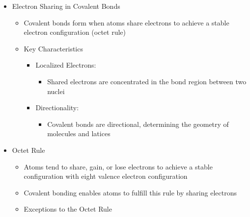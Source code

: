 \begin{itemize}

  \item Electron Sharing in Covalent Bonds

    \begin{itemize}

      \item Covalent bonds form when atoms share electrons to achieve a stable electron configuration (octet rule)

      \item Key Characteristics

        \begin{itemize}

          \item Localized Electrons:

            \begin{itemize}

              \item Shared electrons are concentrated in the bond region between two nuclei

            \end{itemize}

          \item Directionality:

            \begin{itemize}

              \item Covalent bonds are directional, determining the geometry of molecules and latices

            \end{itemize}

        \end{itemize}

    \end{itemize}

  \item Octet Rule

    \begin{itemize}

      \item Atoms tend to share, gain, or lose electrons to achieve a stable configuration with eight valence electron configuration

      \item Covalent bonding enables atoms to fulfill this rule by sharing electrons

      \item Exceptions to the Octet Rule


\end{itemize}
\end{itemize}
